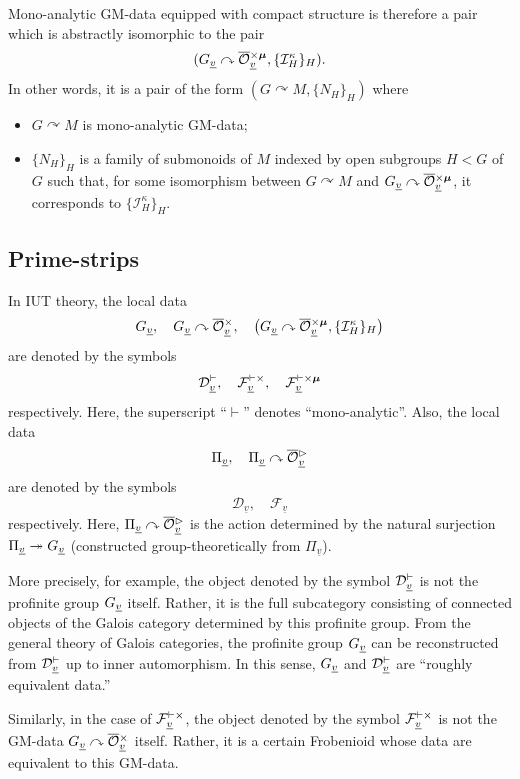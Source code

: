 \documentclass[12pt, reqno, a4paper]{amsart}
\def\udl#1{\underline{#1}} %
\def\acton{\curvearrowright} %
\def\surjto{\twoheadrightarrow}
\def\cD{{\mathcal{D}}}
\def\cF{{\mathcal{F}}}
\def\cI{{\mathcal{I}}}
\def\uv{\udl{v}} %
\begin{document}
Mono-analytic GM-data equipped with compact structure is therefore a pair which is abstractly isomorphic to the pair
$$
(\GG_{\uv}\acton\oOOxmu_{\uv}, \{\cI^{\kappa}_H\}_H).
$$
In other words, it is a pair of the form $(G\acton M,\{N_H\}_H)$ where
\begin{itemize}
\item[(a)] $G\acton M$ is mono-analytic GM-data;
\item[(b)] $\{N_H\}_H$ is a family of submonoids of $M$ indexed by open subgroups $H<G$ of $G$ such that, for some isomorphism between $G\acton M$ and $\GG_{\uv}\acton \oOOxmu_{\uv}$, it corresponds to $\{\cI^{\kappa}_H\}_H$.
\end{itemize}

\subsection{Prime-strips}\label{sub:primeStrips}
In IUT theory, the local data
\[
\GG_{\uv},\quad \GG_{\uv} \acton \oOOx_{\uv},\quad
\bigl(\GG_{\uv} \acton \oOOxmu_{\uv},\{\cI^{\kappa}_H\}_H\bigr)
\]
are denoted by the symbols
\[
\cDv_{\uv},\quad \cFvx_{\uv},\quad \cFvxmu_{\uv}
\]
respectively.
Here, the superscript ``$\vdash$'' denotes ``mono-analytic''.
Also, the local data
\[
\Pi_{\uv},\quad \Pi_{\uv} \acton \oOOt_{\uv}
\]
are denoted by the symbols
\[
\cD_{\uv},\quad \cF_{\uv}
\]
respectively.
Here, $\Pi_{\uv} \acton \oOOt_{\uv}$ is the action determined by the natural surjection $\Pi_{\uv} \surjto \GG_{\uv}$ (constructed group-theoretically from $\Pi_{\uv}$).

\begin{rem}
More precisely, for example, the object denoted by the symbol $\cDv_{\uv}$ is not the profinite group $\GG_{\uv}$ itself. Rather, it is the full subcategory consisting of connected objects of the Galois category determined by this profinite group. From the general theory of Galois categories, the profinite group $\GG_{\uv}$ can be reconstructed from $\cDv_{\uv}$ up to inner automorphism. In this sense, $\GG_{\uv}$ and $\cDv_{\uv}$ are ``roughly equivalent data.''

Similarly, in the case of $\cFvx_{\uv}$, the object denoted by the symbol $\cFvx_{\uv}$ is not the GM-data $\GG_{\uv} \acton \oOOx_{\uv}$ itself. Rather, it is a certain Frobenioid whose data are equivalent to this GM-data.
\end{rem}
\end{document}
